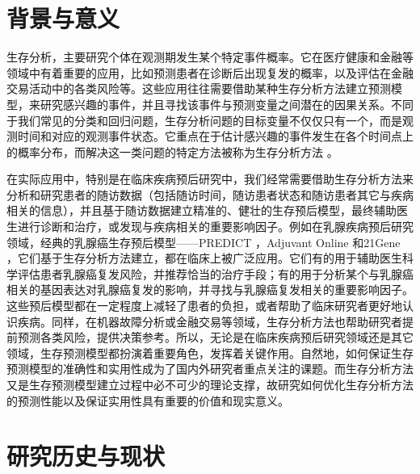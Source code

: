 \thesischapterexordium

\section{背景与意义}

生存分析，主要研究个体在观测期发生某个特定事件概率。它在医疗健康和金融等领域中有着重要的应用，比如预测患者在诊断后出现复发的概率，以及评估在金融交易活动中的各类风险等。这些应用往往需要借助某种生存分析方法建立预测模型，来研究感兴趣的事件，并且寻找该事件与预测变量之间潜在的因果关系。不同于我们常见的分类和回归问题，生存分析问题的目标变量不仅仅只有一个，而是观测时间和对应的观测事件状态。它重点在于估计感兴趣的事件发生在各个时间点上的概率分布，而解决这一类问题的特定方法被称为生存分析方法 。

在实际应用中，特别是在临床疾病预后研究中，我们经常需要借助生存分析方法来分析和研究患者的随访数据（包括随访时间，随访患者状态和随访患者其它与疾病相关的信息），并且基于随访数据建立精准的、健壮的生存预后模型，最终辅助医生进行诊断和治疗，或发现与疾病相关的重要影响因子。例如在乳腺疾病预后研究领域，经典的乳腺癌生存预后模型——PREDICT ，Adjuvant Online  和21Gene ，它们基于生存分析方法建立，都在临床上被广泛应用。它们有的用于辅助医生科学评估患者乳腺癌复发风险，并推荐恰当的治疗手段；有的用于分析某个与乳腺癌相关的基因表达对乳腺癌复发的影响，并寻找与乳腺癌复发相关的重要影响因子。这些预后模型都在一定程度上减轻了患者的负担，或者帮助了临床研究者更好地认识疾病。同样，在机器故障分析或金融交易等领域，生存分析方法也帮助研究者提前预测各类风险，提供决策参考。所以，无论是在临床疾病预后研究领域还是其它领域，生存预测模型都扮演着重要角色，发挥着关键作用。自然地，如何保证生存预测模型的准确性和实用性成为了国内外研究者重点关注的课题。而生存分析方法又是生存预测模型建立过程中必不可少的理论支撑，故研究如何优化生存分析方法的预测性能以及保证实用性具有重要的价值和现实意义。

\section{研究历史与现状}

